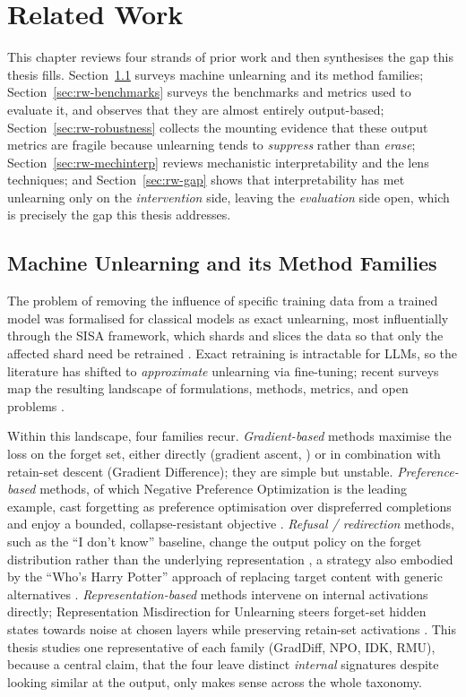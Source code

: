 \chapter{Related Work}
\label{ch:related-work}

This chapter reviews four strands of prior work and then synthesises the gap this thesis fills.
Section~\ref{sec:rw-methods} surveys machine unlearning and its method families;
Section~\ref{sec:rw-benchmarks} surveys the benchmarks and metrics used to evaluate it, and observes that
they are almost entirely output-based; Section~\ref{sec:rw-robustness} collects the mounting evidence that
these output metrics are fragile because unlearning tends to \emph{suppress} rather than \emph{erase};
Section~\ref{sec:rw-mechinterp} reviews mechanistic interpretability and the lens techniques; and
Section~\ref{sec:rw-gap} shows that interpretability has met unlearning only on the \emph{intervention} side,
leaving the \emph{evaluation} side open, which is precisely the gap this thesis addresses.

\section{Machine Unlearning and its Method Families}
\label{sec:rw-methods}

The problem of removing the influence of specific training data from a trained model was formalised for
classical models as exact unlearning, most influentially through the SISA framework, which shards and
slices the data so that only the affected shard need be retrained \citep{bourtoule2021machine,cao2015forget}.
Exact retraining is intractable for LLMs, so the literature has shifted to \emph{approximate} unlearning via
fine-tuning; recent surveys map the resulting landscape of formulations, methods, metrics, and open problems
\citep{liu2025rethinking}.

Within this landscape, four families recur. \emph{Gradient-based} methods maximise the loss on the forget
set, either directly (gradient ascent, \citealp{jang2022knowledge,yao2023llmunlearning}) or in combination
with retain-set descent (Gradient Difference); they are simple but unstable. \emph{Preference-based} methods,
of which Negative Preference Optimization is the leading example, cast forgetting as preference optimisation
over dispreferred completions and enjoy a bounded, collapse-resistant objective \citep{zhang2024npo,
rafailov2023dpo}. \emph{Refusal / redirection} methods, such as the ``I don't know'' baseline, change the
output policy on the forget distribution rather than the underlying representation \citep{maini2024tofu}, a
strategy also embodied by the ``Who's Harry Potter'' approach of replacing target content with generic
alternatives \citep{eldan2023whp}. \emph{Representation-based} methods intervene on internal activations
directly; Representation Misdirection for Unlearning steers forget-set hidden states towards noise at chosen
layers while preserving retain-set activations \citep{li2024wmdp}. This thesis studies one representative of
each family (GradDiff, NPO, IDK, RMU), because a central claim, that the four leave distinct \emph{internal}
signatures despite looking similar at the output, only makes sense across the whole taxonomy.

